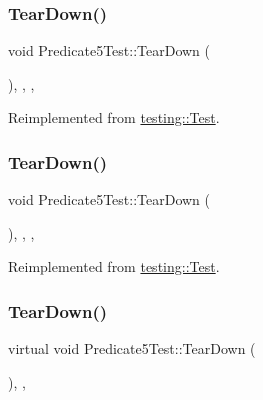 \subsubsection{\texorpdfstring{TearDown()}{TearDown()}\hspace{0.1cm}{\footnotesize\ttfamily [1/3]}}
{\footnotesize\ttfamily void Predicate5\+Test\+::\+Tear\+Down (\begin{DoxyParamCaption}{ }\end{DoxyParamCaption})\hspace{0.3cm}{\ttfamily [inline]}, {\ttfamily [override]}, {\ttfamily [protected]}, {\ttfamily [virtual]}}



Reimplemented from \mbox{\hyperlink{classtesting_1_1_test_a5f0ab439802cbe0ef7552f1a9f791923}{testing\+::\+Test}}.

\mbox{\label{class_predicate5_test_aab641802c35a2a90f8db0b04dc0c6064}} 
\subsubsection{\texorpdfstring{TearDown()}{TearDown()}\hspace{0.1cm}{\footnotesize\ttfamily [2/3]}}
{\footnotesize\ttfamily void Predicate5\+Test\+::\+Tear\+Down (\begin{DoxyParamCaption}{ }\end{DoxyParamCaption})\hspace{0.3cm}{\ttfamily [inline]}, {\ttfamily [override]}, {\ttfamily [protected]}, {\ttfamily [virtual]}}



Reimplemented from \mbox{\hyperlink{classtesting_1_1_test_a5f0ab439802cbe0ef7552f1a9f791923}{testing\+::\+Test}}.

\mbox{\label{class_predicate5_test_ab7bc4521d96174d5ef96156edc15444d}} 
\subsubsection{\texorpdfstring{TearDown()}{TearDown()}\hspace{0.1cm}{\footnotesize\ttfamily [3/3]}}
{\footnotesize\ttfamily virtual void Predicate5\+Test\+::\+Tear\+Down (\begin{DoxyParamCaption}{ }\end{DoxyParamCaption})\hspace{0.3cm}{\ttfamily [inline]}, {\ttfamily [protected]}, {\ttfamily [virtual]}}




